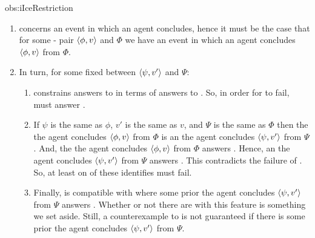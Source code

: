 \begin{note}
\begin{motivation}{obs:iIceRestriction}
    \begin{enumerate}[label=\arabic*., ref=\arabic*]
    \item
      \qWhy{} concerns an event in which an agent concludes, hence it must be the case that for some - pair \(\langle\phi, v\rangle\) and \pool{} \(\Phi\) we have an event in which an agent concludes \(\langle\phi, v\rangle\) from \(\Phi\).
    \item
      In turn, for some fixed \fofr{} between \(\langle\psi, v'\rangle\) and \(\Psi\):
      \begin{enumerate}[label=\Alph*., ref=\Alph*]
      \item
        \issueInclusion{} constrains answers to \qWhy{} in terms of answers to \qHow{}.
        So, in order for \issueInclusion{} to fail,  must answer \qWhy{}.
      \item
        If \(\psi\) is the same as \(\phi\), \(v'\) is the same as \(v\), and \(\Psi\) is the same as \(\Phi\) then the  the agent concludes \(\langle\phi, v\rangle\) from \(\Phi\) is an  the agent concludes \(\langle\psi, v'\rangle\) from \(\Psi\).
        And, the  the agent concludes \(\langle\phi, v\rangle\) from \(\Phi\) answers \qHow{}.
        Hence, an  the agent concludes \(\langle\psi, v'\rangle\) from \(\Psi\) answers \qHow{}.
        This contradicts the failure of \issueInclusion{}.
        So, at least on of these identifies must fail.
      \item
        Finally, \qHow{} is compatible with  where some prior  the agent concludes \(\langle\psi, v'\rangle\) from \(\Psi\) answers \qHow{}.
        Whether or not there are  with this feature is something we set aside.
        Still, a counterexample to \issueInclusion{} is not guaranteed if there is some prior  the agent concludes \(\langle\psi, v'\rangle\) from \(\Psi\).
      \end{enumerate}
    \end{enumerate}
    \vspace{-\baselineskip}
  \end{motivation}
\end{note}


